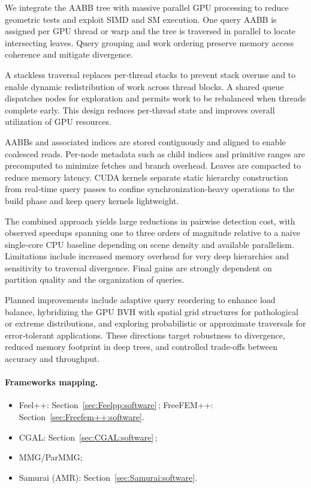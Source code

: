 We integrate the AABB tree with massive parallel GPU processing to reduce geometric tests and exploit SIMD and SM execution. One query AABB is assigned per GPU thread or warp and the tree is traversed in parallel to locate intersecting leaves. Query grouping and work ordering preserve memory access coherence and mitigate divergence.  

A stackless traversal replaces per‑thread stacks to prevent stack overuse and to enable dynamic redistribution of work across thread blocks. A shared queue dispatches nodes for exploration and permits work to be rebalanced when threads complete early. This design reduces per‑thread state and improves overall utilization of GPU resources.  

AABBs and associated indices are stored contiguously and aligned to enable coalesced reads. Per‑node metadata such as child indices and primitive ranges are precomputed to minimize fetches and branch overhead. Leaves are compacted to reduce memory latency. CUDA kernels separate static hierarchy construction from real‑time query passes to confine synchronization‑heavy operations to the build phase and keep query kernels lightweight.  

The combined approach yields large reductions in pairwise detection cost, with observed speedups spanning one to three orders of magnitude relative to a naive single‑core CPU baseline depending on scene density and available parallelism. Limitations include increased memory overhead for very deep hierarchies and sensitivity to traversal divergence. Final gains are strongly dependent on partition quality and the organization of queries.  

Planned improvements include adaptive query reordering to enhance load balance, hybridizing the GPU BVH with spatial grid structures for pathological or extreme distributions, and exploring probabilistic or approximate traversals for error‑tolerant applications. These directions target robustness to divergence, reduced memory footprint in deep trees, and controlled trade‑offs between accuracy and throughput.



\paragraph{Frameworks mapping.}
\begin{itemize}
    \item Feel++: Section~\ref{sec:Feelpp:software}\,; FreeFEM++: Section~\ref{sec:Freefem++:software}.
    \item CGAL: Section~\ref{sec:CGAL:software}\,; 
    \item MMG/ParMMG;
    \item Samurai (AMR): Section~\ref{sec:Samurai:software}.
\end{itemize}

